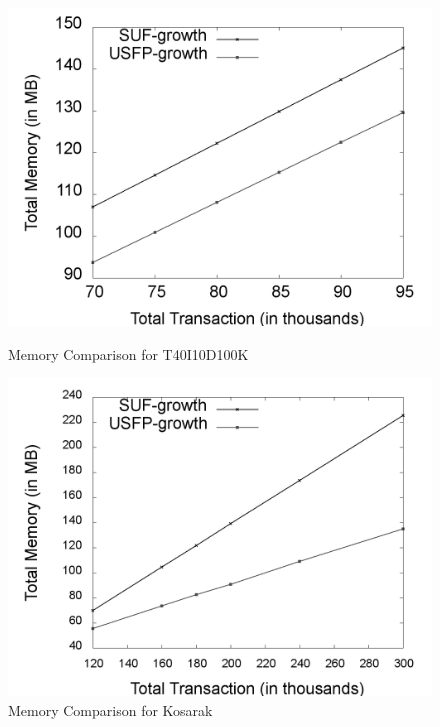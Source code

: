 \documentclass[10pt, conference, compsocconf]{IEEEtran}
\begin{document}
\begin{figure}[t]
	\begin{minipage}{0.49\linewidth}
		\centering
		\includegraphics[width=\textwidth]{images/result/g_t10_memory_node}
		\caption{Memory Comparison for T40I10D100K}
		\label{result:g_t10_memory_node}
	\end{minipage}%
	\begin{minipage}{0.49\linewidth}
	   \centering
	   \includegraphics[width=\textwidth]{images/result/g_k_memory_node}
	   \caption{Memory Comparison for Kosarak}
	   \label{result:g_k_memory_node}
    \end{minipage}
\end{figure}
\end{document}
